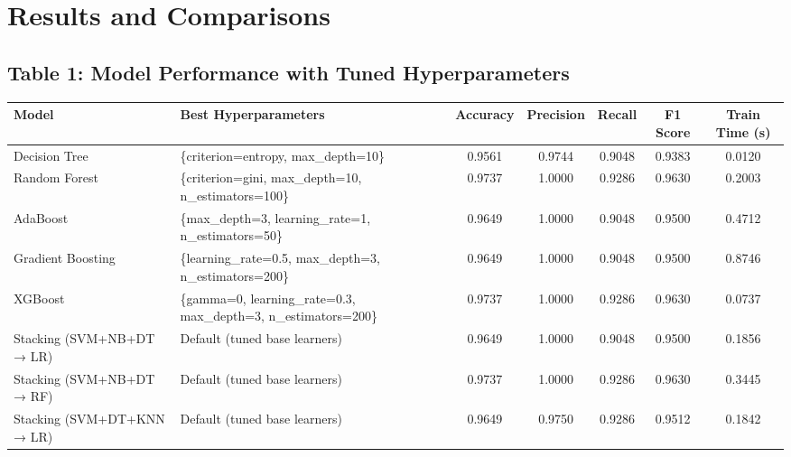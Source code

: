 \documentclass[12pt]{article}
\begin{document}
\section*{Results and Comparisons}

\subsection*{Table 1: Model Performance with Tuned Hyperparameters}
\begin{tabular}{|l|l|c|c|c|c|c|}
\hline
\textbf{Model} & \textbf{Best Hyperparameters} & \textbf{Accuracy} & \textbf{Precision} & \textbf{Recall} & \textbf{F1 Score} & \textbf{Train Time (s)} \\
\hline
Decision Tree & \{criterion=entropy, max\_depth=10\} & 0.9561 & 0.9744 & 0.9048 & 0.9383 & 0.0120 \\
Random Forest & \{criterion=gini, max\_depth=10, n\_estimators=100\} & 0.9737 & 1.0000 & 0.9286 & 0.9630 & 0.2003 \\
AdaBoost & \{max\_depth=3, learning\_rate=1, n\_estimators=50\} & 0.9649 & 1.0000 & 0.9048 & 0.9500 & 0.4712 \\
Gradient Boosting & \{learning\_rate=0.5, max\_depth=3, n\_estimators=200\} & 0.9649 & 1.0000 & 0.9048 & 0.9500 & 0.8746 \\
XGBoost & \{gamma=0, learning\_rate=0.3, max\_depth=3, n\_estimators=200\} & 0.9737 & 1.0000 & 0.9286 & 0.9630 & 0.0737 \\
Stacking (SVM+NB+DT → LR) & Default (tuned base learners) & 0.9649 & 1.0000 & 0.9048 & 0.9500 & 0.1856 \\
Stacking (SVM+NB+DT → RF) & Default (tuned base learners) & 0.9737 & 1.0000 & 0.9286 & 0.9630 & 0.3445 \\
Stacking (SVM+DT+KNN → LR) & Default (tuned base learners) & 0.9649 & 0.9750 & 0.9286 & 0.9512 & 0.1842 \\
\hline
\end{tabular}
\end{document}
